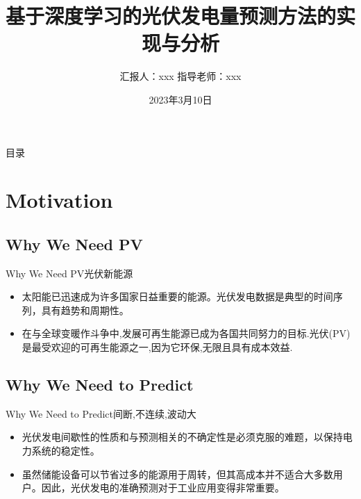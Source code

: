 \documentclass{ctexbeamer}
\title[光伏发电预测]{基于深度学习的光伏发电量预测方法的实现与分析}
\author{汇报人：xxx \newline  指导老师：xxx}
\institute{xxx}
\date{2023年3月10日}
\begin{document}
\begin{frame}
  \titlepage
\end{frame}


\begin{frame}{目录}

    \tableofcontents     %
  
\end{frame}

\AtBeginSection[]{
	\begin{frame}
		\tableofcontents[currentsection]
	\end{frame}
} %



\graphicspath{{figures/}}

\section{Motivation}
\subsection{Why We Need PV}

    \begin{frame}{Why We Need PV}{光伏新能源}
        \begin{itemize}
        \item
        太阳能已迅速成为许多国家日益重要的能源。光伏发电数据是典型的时间序列，具有趋势和周期性。
        \item
        在与全球变暖作斗争中,发展可再生能源已成为各国共同努力的目标.光伏(PV)是最受欢迎的可再生能源之一,因为它环保,无限且具有成本效益.
        \end{itemize}
    \end{frame}



\subsection{Why We Need to Predict}
    \begin{frame}{Why We Need to Predict}{间断,不连续,波动大}
        \begin{itemize}
        \item
        光伏发电间歇性的性质和与预测相关的不确定性是必须克服的难题，以保持电力系统的稳定性。
        \item
        虽然储能设备可以节省过多的能源用于周转，但其高成本并不适合大多数用户。因此，光伏发电的准确预测对于工业应用变得非常重要。
        \end{itemize}
    \end{frame}
\end{document}
